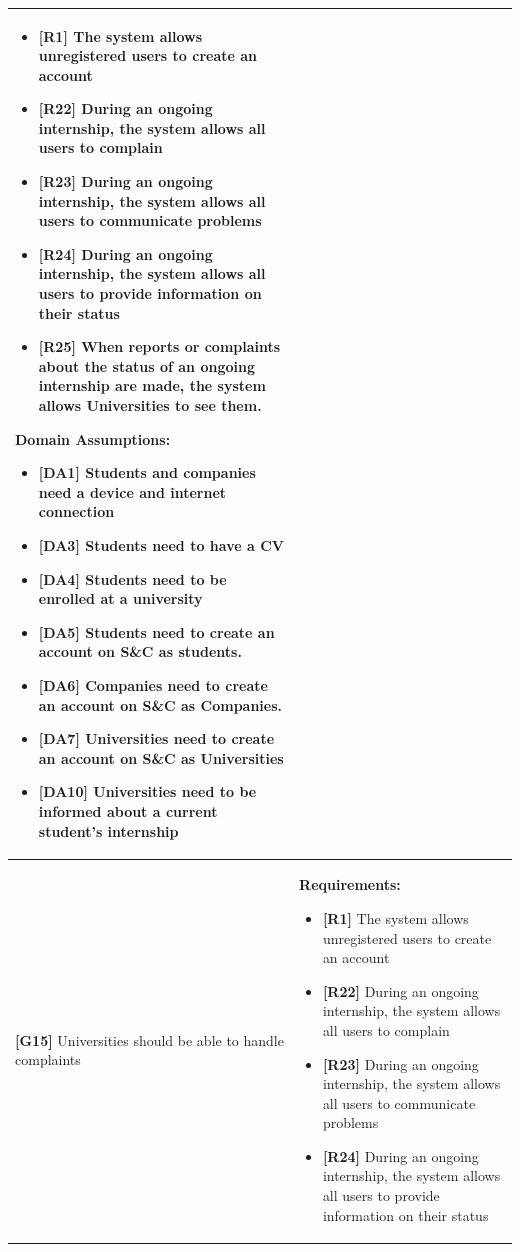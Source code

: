 \begin{longtable}{|p{}|p{}|}
\begin{itemize}
    \item \textbf{[R1]} The system allows unregistered users to create an account
    \item \textbf{[R22]} During an ongoing internship, the system allows all users to complain
    \item \textbf{[R23]} During an ongoing internship, the system allows all users to communicate problems
    \item \textbf{[R24]} During an ongoing internship, the system allows all users to provide information on their status
    \item \textbf{[R25]} When reports or complaints about the status of an ongoing internship are made, the system allows Universities to see them.
\end{itemize}
\textbf{Domain Assumptions:}
\begin{itemize}
    \item \textbf{[DA1]} Students and companies need a device and internet connection
     \item \textbf{[DA3]} Students need to have a CV
     \item \textbf{[DA4]} Students need to be enrolled at a university
    \item \textbf{[DA5]} Students need to create an account on S\&C as students.
    \item \textbf{[DA6]} Companies need to create an account on S\&C as Companies.
    \item \textbf{[DA7]} Universities need to create an account on S\&C as Universities
    \item \textbf{[DA10]} Universities need to be informed about a current student’s internship
\end{itemize} \\
\hline
\textbf{[G15]} Universities should be able to handle complaints
& 
\textbf{Requirements:}
\begin{itemize}
    \item \textbf{[R1]} The system allows unregistered users to create an account
    \item \textbf{[R22]} During an ongoing internship, the system allows all users to complain
    \item \textbf{[R23]} During an ongoing internship, the system allows all users to communicate problems
    \item \textbf{[R24]} During an ongoing internship, the system allows all users to provide information on their status

\end{itemize}
\end{longtable}

